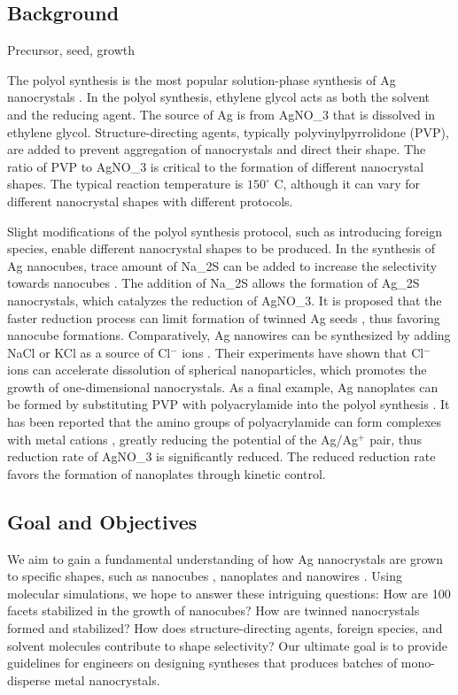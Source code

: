 \subsection{Background}

Precursor, seed, growth

The polyol synthesis is the most popular solution-phase synthesis of Ag nanocrystals \cite{Skrabalak_2007}.
In the polyol synthesis, ethylene glycol acts as both the solvent and the reducing agent.
The source of Ag is from AgNO_3 that is dissolved in ethylene glycol.
Structure-directing agents, typically polyvinylpyrrolidone (PVP), are added to prevent aggregation of nanocrystals and direct their shape.
The ratio of PVP to AgNO_3 is critical to the formation of different nanocrystal shapes.
The typical reaction temperature is $150^{\circ}$ C, although it can vary for different nanocrystal shapes with different protocols.

Slight modifications of the polyol synthesis protocol, such as introducing foreign species, enable different nanocrystal shapes to be produced.
In the synthesis of Ag nanocubes, trace amount of Na_2S can be added to increase the selectivity towards nanocubes \cite{Skrabalak_2007}.
The addition of Na_2S allows the formation of Ag_2S nanocrystals, which catalyzes the reduction of AgNO_3.
It is proposed that the faster reduction process can limit formation of twinned Ag seeds \cite{Wiley_2006}, thus favoring nanocube formations.
Comparatively, Ag nanowires can be synthesized by adding NaCl or KCl as a source of Cl$^-$ ions \cite{Tsuji_2008}.
Their experiments have shown that Cl$^-$ ions can accelerate dissolution of spherical nanoparticles, which promotes the growth of one-dimensional nanocrystals.
As a final example, Ag nanoplates can be formed by substituting PVP with polyacrylamide into the polyol synthesis \cite{Xiong_2007}.
It has been reported that the amino groups of polyacrylamide can form complexes with metal cations \cite{Sari_2006}, greatly reducing the potential of the Ag/Ag$^+$ pair, thus reduction rate of AgNO_3 is significantly reduced.
The reduced reduction rate favors the formation of nanoplates through kinetic control.

\subsection{Goal and Objectives}

We aim to gain a fundamental understanding of how Ag nanocrystals are grown to specific shapes, such as nanocubes \cite{Im_2005}, nanoplates \cite{Lofton_2005} and nanowires \cite{Tsuji_2008}.
Using molecular simulations, we hope to answer these intriguing questions:
How are {100} facets stabilized in the growth of nanocubes?
How are twinned nanocrystals formed and stabilized?
How does structure-directing agents, foreign species, and solvent molecules contribute to shape selectivity?
Our ultimate goal is to provide guidelines for engineers on designing syntheses that produces batches of mono-disperse metal nanocrystals.

